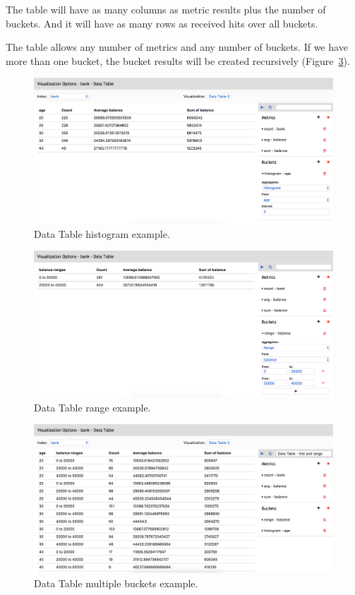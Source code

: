 \documentclass[a4paper, 12pt, english]{book}
\begin{document}
The table will have as many columns as metric results plus the number of buckets. And it will have as many rows as received hits over all buckets.

The table allows any number of metrics and any number of buckets. If we have more than one bucket, the bucket results will be created recursively (Figure~\ref{fig:data-table-multiaggregation-calculation}).

\begin{figure}
  \centering
  \includegraphics[width=13cm, keepaspectratio]{img/data-table-histogram-calculation.png}
  \caption{Data Table histogram example.}
  \label{fig:data-table-histogram-calculation-view}
\end{figure}

\begin{figure}
  \centering
  \includegraphics[width=13cm, keepaspectratio]{img/data-table-range-calculation.png}
  \caption{Data Table range example.}
  \label{fig:data-table-range-calculation}
\end{figure}

\begin{figure}
  \centering
  \includegraphics[width=13cm, keepaspectratio]{img/data-table-multiaggregation-calculation.png}
  \caption{Data Table multiple buckets example.}
  \label{fig:data-table-multiaggregation-calculation}
\end{figure}
\end{document}

